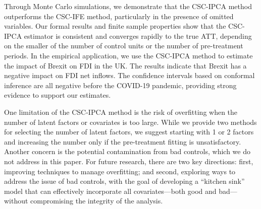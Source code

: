 \documentclass[12pt]{article}
\begin{document}
Through Monte Carlo simulations, we demonstrate that the CSC-IPCA method outperforms the CSC-IFE method, particularly in the presence of omitted variables. Our formal results and finite sample properties show that the CSC-IPCA estimator is consistent and converges rapidly to the true ATT, depending on the smaller of the number of control units or the number of pre-treatment periods. In the empirical application, we use the CSC-IPCA method to estimate the impact of Brexit on FDI in the UK. The results indicate that Brexit has a negative impact on FDI net inflows. The confidence intervals based on conformal inference are all negative before the COVID-19 pandemic, providing strong evidence to support our estimates.

One limitation of the CSC-IPCA method is the risk of overfitting when the number of latent factors or covariates is too large. While we provide two methods for selecting the number of latent factors, we suggest starting with 1 or 2 factors and increasing the number only if the pre-treatment fitting is unsatisfactory. Another concern is the potential contamination from bad controls, which we do not address in this paper. For future research, there are two key directions: first, improving techniques to manage overfitting; and second, exploring ways to address the issue of bad controls, with the goal of developing a ``kitchen sink'' model that can effectively incorporate all covariates—both good and bad—without compromising the integrity of the analysis.

\clearpage
\begingroup
{}


\endgroup

\clearpage
\appendix
{}
\renewcommand{\theequation}{\thesection.\arabic{equation}}
\setcounter{equation}{0}
\renewcommand{\theassumption}{\thesection.\arabic{assumption}}
\setcounter{assumption}{1}
\renewcommand{\thefigure}{\thesection.\arabic{figure}}
\setcounter{figure}{0}
\renewcommand{\thetable}{\thesection.\arabic{table}}
\setcounter{figure}{0}
\end{document}

